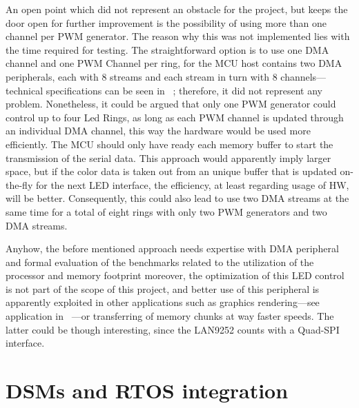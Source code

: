 An open point which did not represent an obstacle for the project, but keeps the door open for further improvement is 
the possibility of using more than one channel per PWM generator. The reason why this was not implemented lies with 
the time required for testing. The straightforward option is to use one DMA channel and one PWM Channel per ring, 
for the MCU host contains two DMA peripherals, each with 8 streams and each stream in turn with 8 channels---technical
specifications can be seen in ~\cite{stm32f446_data}; 
therefore, it did not represent any problem. 
Nonetheless, it could be argued that only one PWM generator could control up to four Led Rings, as long as each PWM channel is updated through
an individual DMA channel, this way the hardware would be used more efficiently. The MCU should only have ready each memory buffer 
to start the transmission of the serial data. This approach would apparently imply larger space, but if the color data 
is taken 
out from an unique buffer that is updated on-the-fly for the next LED interface, the efficiency, at least regarding usage of HW, will be better. 
Consequently, this could also lead to use two DMA streams at the same time for a total of eight rings with only two PWM generators 
and two DMA streams. 

Anyhow, the before mentioned approach needs expertise with DMA peripheral and formal evaluation of the benchmarks related to 
the utilization
of the processor and memory footprint moreover, the optimization of this LED control is not part of the scope of this project, and 
better use of this peripheral is apparently exploited in other applications such as graphics rendering---see application in ~\cite{stm32_dmaapp}---or 
transferring of
memory chunks at way faster speeds. The latter could be though interesting, since the LAN9252 counts with a Quad-SPI interface.




\section{DSMs and RTOS integration}\label{sec:scheduling_results}

        
     
